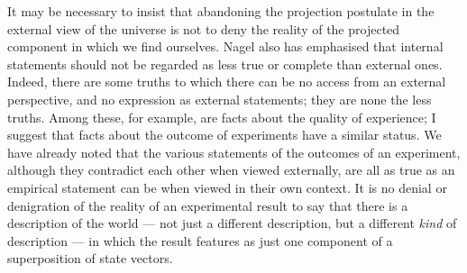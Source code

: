 \documentclass[12pt,a4paper,reqno]{article}
\renewcommand{\(}{\left(}
\renewcommand{\)}{\right)}
\newcommand{\<}{\langle}
\renewcommand{\>}{\rangle}
\theoremstyle{plain} %
\theoremstyle{definition}
\theoremstyle{remark}
\begin{document}
It may be necessary to insist that abandoning the projection postulate
in the external view of the universe is not to deny the reality of the
projected component in which we find ourselves. Nagel also
\cite{Nagel:nowhere} has emphasised that internal statements should not
be regarded as less true or complete than external ones. Indeed, there
are some truths to which there can be no access from an external
perspective, and no expression as external statements; they  are none
the less truths. 
Among these, for example, are facts about the quality of experience;  I
suggest that facts about the
outcome of experiments have a similar status.
We have already noted that the various statements of the outcomes of an
experiment, although they contradict each other when viewed externally,
are all as true as an empirical statement can be when viewed in their
own context. It is no denial or denigration of the reality of an
experimental result to say that there is a description of the world ---
not just a different description, but a different {\em kind} of
description --- in which the result features as just one component of a
superposition of state vectors.
\end{document}
